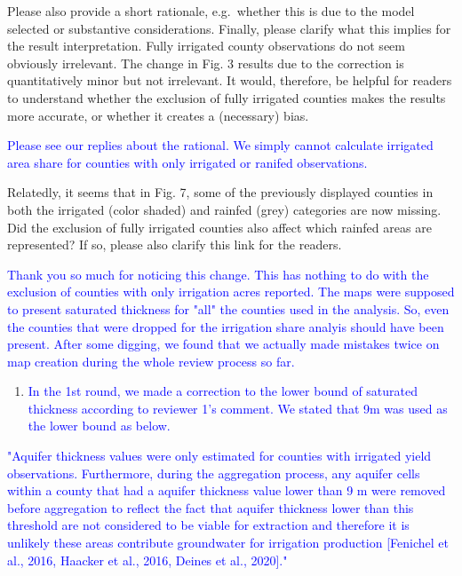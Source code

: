 \documentclass[
]{article}
\providecommand{\tightlist}{%
  \setlength{\itemsep}{0pt}\setlength{\parskip}{0pt}}
\begin{document}
Please also provide a short rationale, e.g.~whether this is due to the
model selected or substantive considerations. Finally, please clarify
what this implies for the result interpretation. Fully irrigated county
observations do not seem obviously irrelevant. The change in Fig. 3
results due to the correction is quantitatively minor but not
irrelevant. It would, therefore, be helpful for readers to understand
whether the exclusion of fully irrigated counties makes the results more
accurate, or whether it creates a (necessary) bias.

\textcolor{blue}{Please see our replies about the rational. We simply cannot calculate irrigated area share for counties with only irrigated or ranifed observations.}

Relatedly, it seems that in Fig. 7, some of the previously displayed
counties in both the irrigated (color shaded) and rainfed (grey)
categories are now missing. Did the exclusion of fully irrigated
counties also affect which rainfed areas are represented? If so, please
also clarify this link for the readers.

\textcolor{blue}{Thank you so much for noticing this change. This has nothing to do with the exclusion of counties with only irrigation acres reported. The maps were supposed to present saturated thickness for "all" the counties used in the analysis. So, even the counties that were dropped for the irrigation share analyis should have been present. After some digging, we found that we actually made mistakes twice on map creation during the whole review process so far.}

\begin{enumerate}
\def\labelenumi{\arabic{enumi}.}
\tightlist
\item
  \textcolor{blue}{In the 1st round, we made a correction to the lower bound of saturated thickness according to reviewer 1's comment. We stated that 9m was used as the lower bound as below.}
\end{enumerate}

\textcolor{blue}{"Aquifer thickness values were only estimated for counties with irrigated yield observations. Furthermore, during the aggregation process, any aquifer cells within a county that had a aquifer thickness value lower than 9 m were removed before aggregation to reflect the fact that aquifer thickness lower than this threshold are not considered to be viable for extraction and therefore it is unlikely these areas contribute groundwater for irrigation production [Fenichel et al., 2016, Haacker et al., 2016, Deines et al., 2020]."}
\end{document}
